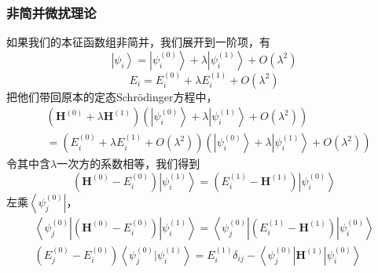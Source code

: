 \documentclass[12pt,a4paper,openany,twoside]{book}
\numberwithin{equation}{section}
\newcommand{\sch}{Schr\"odinger}
\begin{document}
          \subsubsection{非简并微扰理论}
            如果我们的本征函数组非简并，我们展开到一阶项，有
            \begin{equation}
              \left|\psi_{i}\right\rangle=\left|\psi_{i}^{(0)}\right\rangle+\lambda\left|\psi_{i}^{(1)}\right\rangle+ O\left(\lambda^{2}\right)
            \end{equation}
            \begin{equation}
              E_{i}=E_{i}^{(0)}+\lambda E_{i}^{(1)}+O\left(\lambda^{2}\right)
            \end{equation}
            把他们带回原本的定态\sch 方程中，
            \begin{equation}
              \begin{aligned}
                &\left(\mathbf{H}^{(0)}+\lambda \mathbf{H}^{(1)}\right)\left(\left|\psi_{i}^{(0)}\right\rangle+\lambda\left|\psi_{i}^{(1)}\right\rangle+ O\left(\lambda^{2}\right)\right)\\&=\left(E_{i}^{(0)}+\lambda E_{i}^{(1)}+O\left(\lambda^{2}\right)\right)\left(\left|\psi_{i}^{(0)}\right\rangle+\lambda\left|\psi_{i}^{(1)}\right\rangle+ O\left(\lambda^{2}\right)\right)
              \end{aligned}
            \end{equation}
            令其中含$\lambda$一次方的系数相等，我们得到
            \begin{equation}
              \left(\mathbf{H}^{(0)}-E_{i}^{(0)}\right)\left|\psi_{i}^{(1)}\right\rangle=\left(E_{i}^{(1)}-\mathbf{H}^{(1)}\right) \left| \psi_{i}^{(0)}\right\rangle
              \label{1stPert}
            \end{equation}
            左乘$\left\langle\psi_j^{(0)}\right|$，
            \begin{equation}
              \begin{array}{l}{\left\langle\psi_{j}^{(0)}\left|\left(\mathbf{H}^{(0)}-E_{i}^{(0)}\right)\right| \psi_{i}^{(1)}\right\rangle=\left\langle\psi_{j}^{(0)}\left|\left(E_{i}^{(1)}-\mathbf{H}^{(1)}\right)\right| \psi_{i}^{(0)}\right\rangle} \\ {\left(E_{j}^{(0)}-E_{i}^{(0)}\right)\left\langle\psi_{j}^{(0)} | \psi_{i}^{(1)}\right\rangle= E_{i}^{(1)} \delta_{i j}-\left\langle\psi_{j}^{(0)}\left|\mathbf{H}^{(1)}\right| \psi_{i}^{(0)}\right\rangle}\end{array}
            \end{equation}
\end{document}
